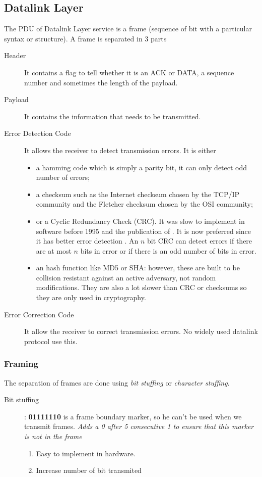 \subsection{Datalink Layer}
The PDU of Datalink Layer service is a frame (sequence of bit with a particular syntax or structure).
A frame is separated in 3 parts
\begin{description}
  \item[Header] It contains a flag to tell whether it is an ACK or DATA, a sequence number and sometimes the length of the payload.
  \item[Payload] It contains the information that needs to be transmitted.
  \item[Error Detection Code] It allows the receiver to detect transmission errors.
    It is either
    \begin{itemize}
      \item a hamming code which is simply a parity bit, it can only detect odd number of errors;
      \item a checksum such as the Internet checksum chosen by the TCP/IP community and the
        Fletcher checksum chosen by the OSI community;
      \item or a Cyclic Redundancy Check (CRC).
        It was slow to implement in software before 1995 and the publication of \cite{feldmeier1995fast}.
        It is now preferred since it has better error detection \cite{stone1998performance}.
        An $n$ bit CRC can detect errors if there are at most $n$
        bits in error or if there is an odd number of bits in error.
      \item an hash function like MD5 or SHA: however, these are built to be collision resistant against
        an active adversary, not random modifications.
        They are also a lot slower than CRC or checksums so they are only used in cryptography.
    \end{itemize}
  \item[Error Correction Code] It allow the receiver to correct transmission errors.
    No widely used datalink protocol use this.
\end{description}

\subsubsection{Framing}

The separation of frames are done using \emph{bit stuffing}
or \emph{character stuffing}.

\begin{description}
  \item[Bit stuffing] : \textbf{01111110} is a frame boundary marker, so he can't
    be used when we transmit frames.
    \textit{Adds a 0 after 5 consecutive 1 to ensure that this marker is not in the frame}
    \begin{enumerate}
      \item Easy to implement in hardware.
      \item Increase number of bit transmited
    \end{enumerate}
\end{description}

